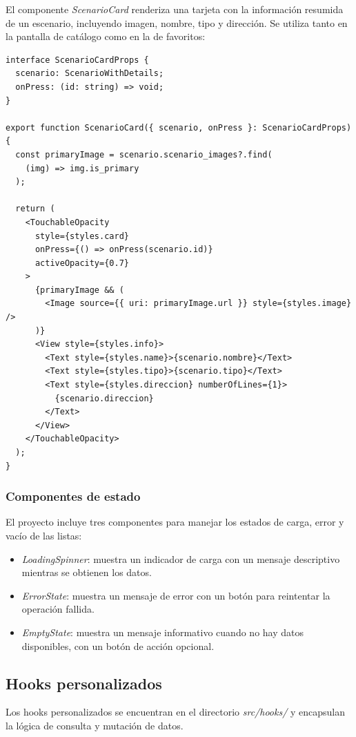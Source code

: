 El componente \textit{ScenarioCard} renderiza una tarjeta con la informaci\'on
resumida de un escenario, incluyendo imagen, nombre, tipo y direcci\'on.
Se utiliza tanto en la pantalla de cat\'alogo como en la de favoritos:

\begin{lstlisting}
interface ScenarioCardProps {
  scenario: ScenarioWithDetails;
  onPress: (id: string) => void;
}

export function ScenarioCard({ scenario, onPress }: ScenarioCardProps) {
  const primaryImage = scenario.scenario_images?.find(
    (img) => img.is_primary
  );

  return (
    <TouchableOpacity
      style={styles.card}
      onPress={() => onPress(scenario.id)}
      activeOpacity={0.7}
    >
      {primaryImage && (
        <Image source={{ uri: primaryImage.url }} style={styles.image} />
      )}
      <View style={styles.info}>
        <Text style={styles.name}>{scenario.nombre}</Text>
        <Text style={styles.tipo}>{scenario.tipo}</Text>
        <Text style={styles.direccion} numberOfLines={1}>
          {scenario.direccion}
        </Text>
      </View>
    </TouchableOpacity>
  );
}
\end{lstlisting}

\subsubsection{Componentes de estado}

El proyecto incluye tres componentes para manejar los estados de carga, error
y vac\'io de las listas:

\begin{itemize}
  \item \textit{LoadingSpinner}: muestra un indicador de carga con un mensaje
    descriptivo mientras se obtienen los datos.
  \item \textit{ErrorState}: muestra un mensaje de error con un bot\'on para
    reintentar la operaci\'on fallida.
  \item \textit{EmptyState}: muestra un mensaje informativo cuando no hay
    datos disponibles, con un bot\'on de acci\'on opcional.
\end{itemize}

\subsection{Hooks personalizados}

Los hooks personalizados se encuentran en el directorio \textit{src/hooks/} y
encapsulan la l\'ogica de consulta y mutaci\'on de datos.

